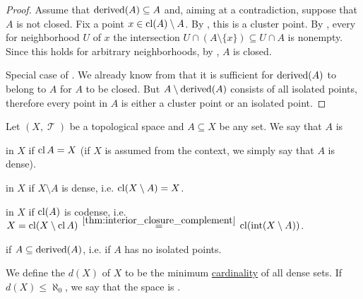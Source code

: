 \begin{proof}
   Assume that \( \operatorname{derived}(A) \subseteq A \) and, aiming at a contradiction, suppose that \( A \) is not closed. Fix a point \( x \in \operatorname{cl}(A) \setminus A \). By , this is a cluster point. By , every for neighborhood \( U \) of \( x \) the intersection \( U \cap (A \setminus \{ x \}) \subseteq U \cap A \) is nonempty. Since this holds for arbitrary neighborhoods, by , \( A \) is closed.

  Special case of .
   We already know from  that it is sufficient for \( \operatorname{derived}(A) \) to belong to \( A \) for \( A \) to be closed. But \( A \setminus \operatorname{derived}(A) \) consists of all isolated points, therefore every point in \( A \) is either a cluster point or an isolated point.
\end{proof}

\begin{definition}\label{def:topologically_dense_set}
  Let \( (X, \mscrT) \) be a topological space and \( A \subseteq X \) be any set. We say that \( A \) is

  \begin{thmenum}
      in \( X \) if \( \operatorname{cl}{A} = X \) (if \( X \) is assumed from the context, we simply say that \( A \) is dense).

      in \( X \) if \( X \setminus A \) is dense, i.e. \( \operatorname{cl}(X \setminus A) = X \).

      in \( X \) if \( \operatorname{cl}(A) \) is codense, i.e. \( X = \cl(X \setminus \cl A) \reloset {\ref{thm:interior_closure_complement}} = \cl(\inter(X \setminus A)) \).

      if \( A \subseteq \operatorname{derived}(A) \), i.e. if \( A \) has no isolated points.
  \end{thmenum}

  We define the  \( d(X) \) of \( X \) to be the minimum \hyperref[def:cardinal]{cardinality} of all dense sets. If \( d(X) \leq \aleph_0 \), we say that the space is .
\end{definition}

